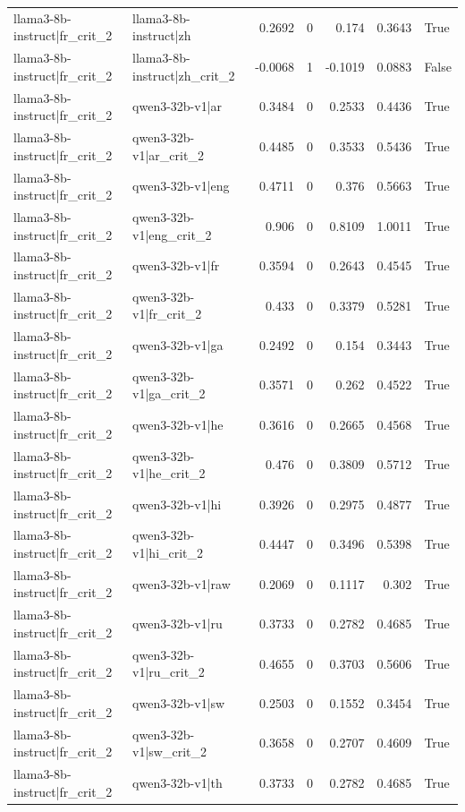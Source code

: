\begin{table}
\begin{tabular}{l l r r r r l}
llama3-8b-instruct|fr_crit_2 & llama3-8b-instruct|zh & 0.2692 & 0 & 0.174 & 0.3643 & True \\
llama3-8b-instruct|fr_crit_2 & llama3-8b-instruct|zh_crit_2 & -0.0068 & 1 & -0.1019 & 0.0883 & False \\
llama3-8b-instruct|fr_crit_2 & qwen3-32b-v1|ar & 0.3484 & 0 & 0.2533 & 0.4436 & True \\
llama3-8b-instruct|fr_crit_2 & qwen3-32b-v1|ar_crit_2 & 0.4485 & 0 & 0.3533 & 0.5436 & True \\
llama3-8b-instruct|fr_crit_2 & qwen3-32b-v1|eng & 0.4711 & 0 & 0.376 & 0.5663 & True \\
llama3-8b-instruct|fr_crit_2 & qwen3-32b-v1|eng_crit_2 & 0.906 & 0 & 0.8109 & 1.0011 & True \\
llama3-8b-instruct|fr_crit_2 & qwen3-32b-v1|fr & 0.3594 & 0 & 0.2643 & 0.4545 & True \\
llama3-8b-instruct|fr_crit_2 & qwen3-32b-v1|fr_crit_2 & 0.433 & 0 & 0.3379 & 0.5281 & True \\
llama3-8b-instruct|fr_crit_2 & qwen3-32b-v1|ga & 0.2492 & 0 & 0.154 & 0.3443 & True \\
llama3-8b-instruct|fr_crit_2 & qwen3-32b-v1|ga_crit_2 & 0.3571 & 0 & 0.262 & 0.4522 & True \\
llama3-8b-instruct|fr_crit_2 & qwen3-32b-v1|he & 0.3616 & 0 & 0.2665 & 0.4568 & True \\
llama3-8b-instruct|fr_crit_2 & qwen3-32b-v1|he_crit_2 & 0.476 & 0 & 0.3809 & 0.5712 & True \\
llama3-8b-instruct|fr_crit_2 & qwen3-32b-v1|hi & 0.3926 & 0 & 0.2975 & 0.4877 & True \\
llama3-8b-instruct|fr_crit_2 & qwen3-32b-v1|hi_crit_2 & 0.4447 & 0 & 0.3496 & 0.5398 & True \\
llama3-8b-instruct|fr_crit_2 & qwen3-32b-v1|raw & 0.2069 & 0 & 0.1117 & 0.302 & True \\
llama3-8b-instruct|fr_crit_2 & qwen3-32b-v1|ru & 0.3733 & 0 & 0.2782 & 0.4685 & True \\
llama3-8b-instruct|fr_crit_2 & qwen3-32b-v1|ru_crit_2 & 0.4655 & 0 & 0.3703 & 0.5606 & True \\
llama3-8b-instruct|fr_crit_2 & qwen3-32b-v1|sw & 0.2503 & 0 & 0.1552 & 0.3454 & True \\
llama3-8b-instruct|fr_crit_2 & qwen3-32b-v1|sw_crit_2 & 0.3658 & 0 & 0.2707 & 0.4609 & True \\
llama3-8b-instruct|fr_crit_2 & qwen3-32b-v1|th & 0.3733 & 0 & 0.2782 & 0.4685 & True \\

\end{tabular}
\end{table}
